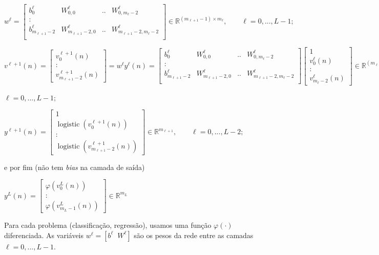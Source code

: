 \documentclass[12pt,a4paper]{article}
\def\RR{\mathbb{R}}
\DeclareMathOperator{\logistic}{logistic}
\begin{document}
$
w^\ell = \begin{bmatrix}
	b_0^\ell & W_{0,0}^\ell & .. & W_{0,m_\ell-2}^\ell\\
	:\\
	b_{m_{\ell+1}-2}^\ell & W_{m_{\ell+1}-2,0}^\ell & .. & W_{m_{\ell+1}-2,m_\ell-2}^\ell\\
\end{bmatrix}
\in \RR^{(m_{\ell+1}-1)\times m_\ell}
,\qquad \ell=0,...,L-1;
$


$
v^{\ell+1}(n) = 
\begin{bmatrix}
v^{\ell+1}_0(n)\\
:\\
v^{\ell+1}_{m_{\ell+1}-2}(n)
\end{bmatrix}
=w^\ell y^\ell(n)=
\begin{bmatrix}
	b_0^\ell & W_{0,0}^\ell & .. & W_{0,m_\ell-2}^\ell\\
	:\\
	b_{m_{\ell+1}-2}^\ell & W_{m_{\ell+1}-2,0}^\ell & .. & W_{m_{\ell+1}-2,m_\ell-2}^\ell\\
\end{bmatrix}
\begin{bmatrix}
	1\\
	 v_0^\ell(n)\\
	:\\
	 v_{m_\ell-2}^\ell(n)
\end{bmatrix}
\in \RR^{(m_{\ell+1}-1)},
$

\hfill$
\ell=0,...,L-1;
$


$
y^{\ell+1}(n) = \begin{bmatrix}
	1\\
	\logistic(v_0^{\ell+1}(n))\\
	:\\
	\logistic(v_{m_{\ell+1}-2}^{\ell+1}(n))
\end{bmatrix}
\in \RR^{m_{\ell+1}}
,\qquad \ell=0,...,L-2;
$

\noindent e por fim (não tem \textit{bias} na camada de saída)

$
y^L(n) = \begin{bmatrix}
	\varphi(v_0^L(n))\\
	:\\
	\varphi(v_{m_L-1}^L(n))
\end{bmatrix}
\in \RR^{m_L}
$

Para cada problema (classificação, regressão), usamos uma função $\varphi(\cdot)$ diferenciada. As variáveis $w^\ell=[b^\ell\;\;W^\ell]$ são os pesos da rede entre as camadas $\ell=0,...,L-1$.
\end{document}
